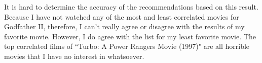 \documentclass[12pt]{article}
\begin{document}
It is hard to determine the accuracy of the recommendations based on this result. Because I have not watched any of the most and least correlated movies for Godfather II, therefore, I can't really agree or disagree with the results of my favorite movie. However, I do agree with the list for my least favorite movie. The top correlated films of ``Turbo: A Power Rangers Movie (1997)" are all horrible movies that I have no interest in whatsoever. 
\pagebreak


\end{document}
